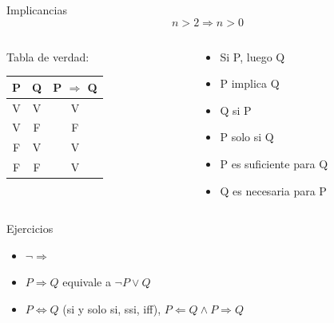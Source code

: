 \documentclass[14pt,aspectratio=169,xcolor=dvipsnames]{beamer}
\begin{document}
\begin{frame}{Implicancias}
    $$ n > 2 \Rightarrow n > 0 $$
    \begin{columns}
        \begin{column}{0.45\textwidth}
            Tabla de verdad:
            \begin{center}
                \begin{tabular}{c c | c}
                    \toprule P & Q & P $\Rightarrow$ Q \\\midrule
                    V & V & V \\
                    V & F & F \\
                    F & V & \alert{V} \\
                    F & F & V  \\ \bottomrule
                \end{tabular}
            \end{center}
        \end{column}
        \begin{column}{0.45\textwidth}
            \begin{itemize}
                \item Si P, luego Q
                \item P implica Q
                \item Q si P
                \item P solo si Q
                \item \alert{P es suficiente para Q}
                \item \alert{Q es necesaria para P}
            \end{itemize}
        \end{column}
    \end{columns}
\end{frame}
\begin{frame}{Ejercicios}
    \begin{itemize}
        \item $\neg \Rightarrow$
        \item $ P\Rightarrow Q$ equivale a $\neg P \vee Q$
        \item $ P\Leftrightarrow Q $  (si y solo si, ssi, iff), $ P \Leftarrow Q  \wedge P \Rightarrow Q  $ 
    \end{itemize}
\end{frame}
\end{document}
